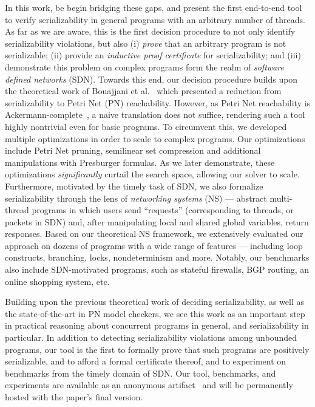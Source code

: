 In this work, be begin bridging these gaps, and present the first end-to-end tool to verify serializability in general programs with an arbitrary number of threads. 
As far as we are aware, this is the first decision procedure to not only identify serializability violations, but also (i) \textit{prove} that an arbitrary program is not serializable; (ii) provide an \textit{inductive proof certificate} for serializability; and (iii) demonstrate this problem on complex programs form the realm of \textit{software defined networks} (SDN).
%
Towards this end, our decision procedure builds upon the theoretical work of Bouajjani et al.~\cite{BoEmEnHa13} which presented a reduction from serializability to Petri Net (PN) reachability.  However, as Petri Net reachability is Ackermann-complete~\cite{CzWo22}, a naive translation does not suffice, rendering such a tool  highly nontrivial even for basic programs. To circumvent this, we developed multiple optimizations in order to scale to complex programs. 
Our optimizations include Petri Net pruning, semilinear set compression and additional manipulations with Presburger formulas.
As we later demonstrate, these optimizations \textit{significantly} curtail the search space, allowing our solver to scale.
%
Furthermore, motivated by the timely task of SDN, 
we also formalize serializability through the lens of \textit{networking systems} (NS) --- abstract multi-thread programs in which users send ``requests'' (corresponding to threads, or packets in SDN) and, after manipulating local and shared global variables, return responses.
Based on our theoretical NS framework, we extensively evaluated our approach on dozens of programs with a wide range of features --- including loop constructs, branching, locks, nondeterminism and more. Notably, our benchmarks also include SDN-motivated programs, such as stateful firewalls, BGP routing, an online shopping system, etc.
  

Building upon the previous theoretical work of deciding serializability, as well as the state-of-the-art in PN model checkers, we see this work as an important step in practical reasoning about concurrent programs in general, and serializability in particular.
In addition to detecting serializability violations among unbounded programs, our tool is the first to formally prove that such programs are positively serializable, and to afford a formal certificate thereof, and to experiment on benchmarks from the timely domain of SDN.
Our tool, benchmarks, and experiments are available as an anonymous artifact~\cite{ArtifactRepository} and will be permanently hosted with the paper’s final version.

